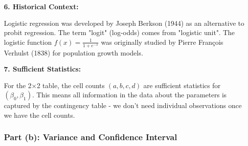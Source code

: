 \documentclass[12pt]{article}
\begin{document}
\begin{explanation}
\textbf{6. Historical Context:}

Logistic regression was developed by Joseph Berkson (1944) as an alternative to probit regression. The term "logit" (log-odds) comes from "logistic unit". The logistic function $f(x) = \frac{1}{1+e^{-x}}$ was originally studied by Pierre François Verhulst (1838) for population growth models.

\textbf{7. Sufficient Statistics:}

For the 2$\times$2 table, the cell counts $(a,b,c,d)$ are sufficient statistics for $(\beta_0, \beta_1)$. This means all information in the data about the parameters is captured by the contingency table - we don't need individual observations once we have the cell counts.
\end{explanation}

\subsubsection{Part (b): Variance and Confidence Interval}
\end{document}
